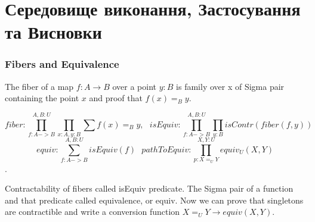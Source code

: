 \chapter{Середовище виконання, Застосування та Висновки}

\subsection{Fibers and Equivalence}

The fiber of a map $f : A \rightarrow B$ over a point $y : B$ is family over x
of Sigma pair containing the point $x$ and proof that $f(x)=_B y$.

$$fiber : \prod_{f:A->B}^{A,B:U}\prod_{x:A,y:B}\sum f(x) =_B y,\ \ \ 
  isEquiv : \prod_{f:A->B}^{A,B:U}\prod_{y:B} isContr(fiber(f,y))$$
$$equiv : \sum_{f:A->B}^{A,B:U} isEquiv(f) \ \ \ 
  pathToEquiv: \prod_{p: X =_U Y}^{X,Y:U} equiv_U(X,Y)$$.

Contractability of fibers called isEquiv predicate. The Sigma pair of
a function and that predicate called equivalence, or equiv. Now we
can prove that singletons are contractible and write a conversion
function $X=_U Y \rightarrow equiv(X,Y)$.

